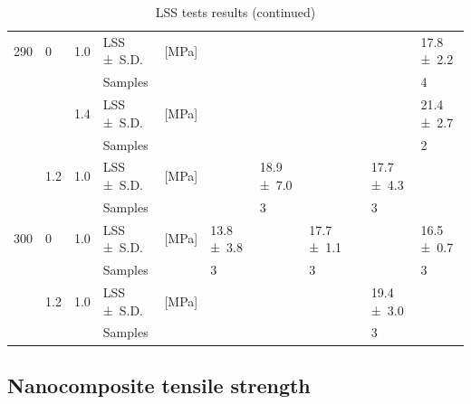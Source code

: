 \documentclass[review,times,sagev,doublespace]{sagej}
\begin{document}
\begin{table}[]
{\begin{tabular}{@{}lll L{1.2cm} l C{0.8cm} C{0.8cm} C{0.8cm} C{0.8cm} C{0.8cm} C{0.8cm}@{}}
			290                & 0        & 1.0       & LSS \mbox{± S.D.} & {[}MPa{]} &                   &                   &                   &                  &                   & 17.8 \mbox{± 2.2} \\
			&          &           & Samples           &           &                   &                   &                   &                  &                   & 4                 \\
			&          & 1.4       & LSS \mbox{± S.D.} & {[}MPa{]} &                   &                   &                   &                  &                   & 21.4 \mbox{± 2.7} \\
			&          &           & Samples           &           &                   &                   &                   &                  &                   & 2                 \\
			& 1.2      & 1.0       & LSS \mbox{± S.D.} & {[}MPa{]} &                   & 18.9 \mbox{± 7.0} &                   &                  & 17.7 \mbox{± 4.3} &                   \\
			&          &           & Samples           &           &                   & 3                 &                   &                  & 3                 &                   \\
			300                & 0        & 1.0       & LSS \mbox{± S.D.} & {[}MPa{]} & 13.8 \mbox{± 3.8} &                   & 17.7 \mbox{± 1.1} &                  &                   & 16.5 \mbox{± 0.7} \\
			&          &           & Samples           &           & 3                 &                   & 3                 &                  &                   & 3                 \\
			& 1.2      & 1.0       & LSS \mbox{± S.D.} & {[}MPa{]} &                   &                   &                   &                  & 19.4 \mbox{± 3.0} &                   \\
			&          &           & Samples           &           &                   &                   &                   &                  & 3                 &                   \\ \bottomrule
	\end{tabular}}
	\caption{LSS tests results (continued) \cite{Brassard2019b}}
	\label{tab:table4}
\end{table}

\FloatBarrier
	\subsection{Nanocomposite tensile strength}
\end{document}
